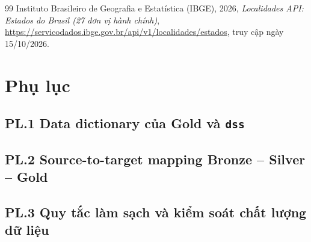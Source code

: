 \documentclass[a4paper]{article}
\begin{document}
\begin{thebibliography}{99}
Instituto Brasileiro de Geografia e Estatística (IBGE), 2026, \textit{Localidades API: Estados do Brasil (27 đơn vị hành chính)}, \url{https://servicodados.ibge.gov.br/api/v1/localidades/estados}, truy cập ngày 15/10/2026.


\end{thebibliography}

\newpage
{}
{}
\section*{Phụ lục}

\label{pl:1}
\subsection*{PL.1 Data dictionary của Gold và \texttt{dss}}

\label{pl:2}
\subsection*{PL.2 Source-to-target mapping Bronze -- Silver -- Gold}

\label{pl:3}
\subsection*{PL.3 Quy tắc làm sạch và kiểm soát chất lượng dữ liệu}
\end{document}
